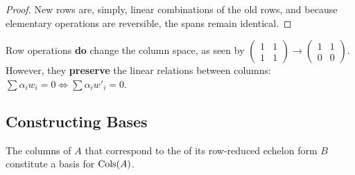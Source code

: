 \begin{proof}
New rows are, simply, linear combinations of the old rows, and because elementary operations are reversible, the spans remain identical.
\end{proof}

\begin{importantremark}
Row operations \textbf{do} change the column space, as seen by $\begin{pmatrix} 1 & 1 \\ 1 & 1 \end{pmatrix} \to \begin{pmatrix} 1 & 1 \\ 0 & 0 \end{pmatrix}$. However, they \textbf{preserve} the linear relations between columns: $\sum \alpha_{i} w_{i} = 0 \iff \sum \alpha_{i} w'_{i} = 0$.
\end{importantremark}

\subsection{Constructing Bases}

\begin{theorem}
\label{thm:basis_col_space}
The columns of $A$ that correspond to the  of its row-reduced echelon form $B$ constitute a basis for $\operatorname{Cols}(A)$.
\end{theorem}


